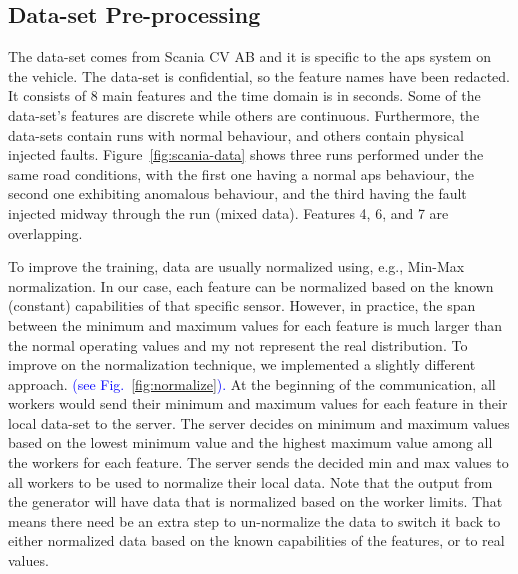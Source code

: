 




\subsection{Data-set Pre-processing}
\label{sec:data-pre-process}
%
 The data-set comes from Scania CV AB and it is specific to the \gls*{aps} system on the vehicle. The data-set is confidential, so the feature names have been redacted. It consists of 8 main features and the time domain is in seconds. Some of the data-set's features are discrete while others are continuous. Furthermore, the data-sets contain runs with normal behaviour, and others contain physical injected faults.
%
Figure~\ref{fig:scania-data} shows three runs performed under the same road conditions, with the first one having a normal \gls*{aps} behaviour, the second one exhibiting anomalous behaviour, and the third having the fault injected midway through the run (mixed data). Features 4, 6, and 7 are overlapping.



To improve the training, data are usually normalized using, e.g., Min-Max normalization. In our case, each feature can be normalized based on the known (constant) capabilities of that specific sensor. %
However, in practice, the span between the minimum and maximum values for each feature is much larger than the normal operating values and my not represent the real distribution.
%
To improve on the normalization technique, we implemented a slightly different approach. \textcolor{blue}{(see Fig.~\ref{fig:normalize}).}
At the beginning of the communication, all workers would send their minimum and maximum values for each feature in their local data-set to the server. The server decides on minimum and maximum values based on the lowest minimum value and the highest maximum value among all the workers for each feature. The server sends the decided min and max values to all workers to be used to normalize their local data. Note that the output from the generator will have data that is normalized based on the worker limits. That means there need be an extra step to un-normalize the data to switch it back to either normalized data based on the known capabilities of the features, or to real values.
\newcommand\normscale{0.6}


